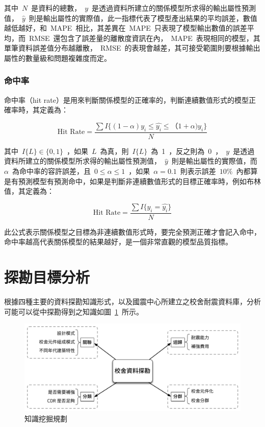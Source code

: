 其中~$N$~是資料的總數，~$y$~是透過資料所建立的關係模型所求得的輸出屬性預測值，~$\hat{y}$~則是輸出屬性的實際值，此一指標代表了模型產出結果的平均誤差，數值越低越好，和~MAPE~相比，其差異在~MAPE~只表現了模型輸出數值的誤差平均，而~RMSE~還包含了誤差量的離散度資訊在內，~MAPE~表現相同的模型，其單筆資料誤差值分布越離散，~RMSE~的表現會越差，其可接受範圍則要根據輸出屬性的數量級和問題複雜度而定。


\subsubsection{命中率}

命中率（hit rate）是用來判斷關係模型的正確率的，判斷連續數值形式的模型正確率時，其定義為：

\begin{equation} \text{Hit Rate} = \dfrac{ \sum{I\{(1 - \alpha)y_i \le \hat{y_i} \le（1 + \alpha)y_i \}} }{N} \label{eq:hitratenum}\end{equation} 

其中~$I\{L\} \in \{0, 1\}$~，如果~$L$~為真，則~$I\{L\}$~為~1~，反之則為~0~，~$y$~是透過資料所建立的關係模型所求得的輸出屬性預測值，~$\hat{y}$~則是輸出屬性的實際值，而~$\alpha$~為命中率的容許誤差，且~$0 \le \alpha \le 1$~，如果~$\alpha = 0.1$~則表示誤差~$10\%$~內都算是有預測模型有預測命中，如果是判斷非連續數值形式的目標正確率時，例如布林值，其定義為：

\begin{equation} \text{Hit Rate} = \dfrac{ \sum{I\{y_i = \hat{y_i}\}} }{N} \label{eq:hitrate}\end{equation} 

此公式表示關係模型之目標為非連續數值形式時，要完全預測正確才會記入命中，命中率越高代表關係模型的結果越好，是一個非常直觀的模型品質指標。



\section{探勘目標分析}

根據四種主要的資料探勘知識形式，以及國震中心所建立之校舍耐震資料庫，分析可能可以從中探勘得到之知識如圖~\ref{fig:bigpicture}~所示。

\begin{figure}[hbtp]
  \begin{center}
    \includegraphics[width=1.0\textwidth]{figures/big-picture.pdf}
    \caption{知識挖掘規劃} 
    \label{fig:bigpicture}
  \end{center}
\end{figure}

